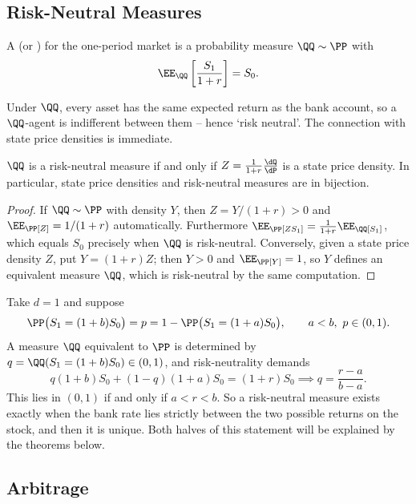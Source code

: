\subsection{Risk-Neutral Measures}

\begin{definition}
	A  (or ) for the one-period market is a probability measure $\QQ \sim \PP$ with
	$$
	\EE_\QQ\left[\frac{S_1}{1+r}\right] = S_0.
	$$
\end{definition}

Under $\QQ$, every asset has the same expected return as the bank account, so a $\QQ$-agent is indifferent between them -- hence `risk neutral'. The connection with state price densities is immediate.

\begin{proposition}
	$\QQ$ is a risk-neutral measure if and only if $Z = \frac{1}{1+r}\frac{\dQ}{\dP}$ is a state price density. In particular, state price densities and risk-neutral measures are in bijection.
\end{proposition}

\begin{proof}
	If $\QQ \sim \PP$ with density $Y$, then $Z = Y/(1+r) > 0$ and $\EE_\PP[Z] = 1/(1+r)$ automatically. Furthermore $\EE_\PP[ZS_1] = \frac{1}{1+r}\EE_\QQ[S_1]$, which equals $S_0$ precisely when $\QQ$ is risk-neutral. Conversely, given a state price density $Z$, put $Y = (1+r)Z$; then $Y > 0$ and $\EE_\PP[Y] = 1$, so $Y$ defines an equivalent measure $\QQ$, which is risk-neutral by the same computation.
\end{proof}

\begin{example}\label{ex:one-period-binom}
	Take $d = 1$ and suppose
	$$
	\PP\big(S_1 = (1+b)S_0\big) = p = 1 - \PP\big(S_1 = (1+a)S_0\big), \qquad a < b,\ p \in (0,1).
	$$
	A measure $\QQ$ equivalent to $\PP$ is determined by $q = \QQ(S_1 = (1+b)S_0) \in (0,1)$, and risk-neutrality demands
	$$
	q(1+b)S_0 + (1-q)(1+a)S_0 = (1+r)S_0 \implies q = \frac{r-a}{b-a}.
	$$
	This lies in $(0,1)$ if and only if $a < r < b$. So a risk-neutral measure exists exactly when the bank rate lies strictly between the two possible returns on the stock, and then it is unique. Both halves of this statement will be explained by the theorems below.
\end{example}

\subsection{Arbitrage}

